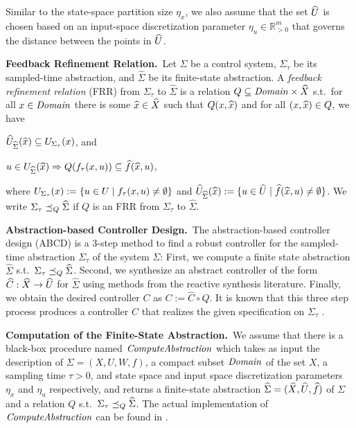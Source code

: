 Similar to the state-space partition size $\eta_x$, we also assume that the set $\widehat{U}$ is chosen based on an input-space discretization parameter $\eta_u\in \mathbb{R}^m_{>0}$ that governs the distance between the points in $\widehat{U}$.

\smallskip
\noindent\textbf{Feedback Refinement Relation.}\
Let $\Sigma$ be a control system, $\Sigma_\tau$ be its sampled-time abstraction, and $\widehat{\Sigma}$ be its finite-state abstraction.
A \emph{feedback refinement relation} (FRR) from $\Sigma_\tau$ to $\widehat{\Sigma}$ 
is a relation $Q\subseteq \mathit{Domain}\times \widehat{X}$ s.t.\ 
for all $x\in \mathit{Domain}$ there is some $\widehat{x}\in \widehat{X}$ such that $Q(x,\widehat{x})$ and
for all $(x,\widehat{x})\in Q$, we have
\begin{inparaenum}[(i)]
 \item $\widehat{U}_{\widehat{\Sigma}}(\widehat{x})\subseteq U_{\Sigma_\tau}(x)$, and 
 \item $u\in U_{\widehat{\Sigma}}(\widehat{x}) \Rightarrow Q(f_\tau(x,u))\subseteq \widehat{f}(\widehat{x},u)$,
\end{inparaenum}
where $U_{\Sigma_\tau}(x):=\{ u\in U \mid f_\tau(x,u)\neq \emptyset \}$ and $\widehat{U}_{\widehat{\Sigma}}(\widehat{x}):=\{ u\in \widehat{U} \mid \widehat{f}(\widehat{x},u)\neq \emptyset \}$.
We write $\Sigma_\tau \preceq_{Q} \widehat{\Sigma}$ if $Q$ is an FRR from $\Sigma_\tau$ to $\widehat{\Sigma}$.

\smallskip
\noindent\textbf{Abstraction-based Controller Design.}\
The abstraction-based controller design (ABCD) \cite{reissig2016feedback} is a $3$-step method to find a robust controller for the sampled-time abstraction $\Sigma_\tau$ of the system $\Sigma$:
First, we compute a finite state abstraction $\widehat{\Sigma}$ s.t.\ $\Sigma_\tau \preceq_{Q} \widehat{\Sigma}$.
Second, we synthesize an abstract controller of the form $\widehat{C}:\widehat{X}\rightarrow \widehat{U}$ for $\widehat{\Sigma}$ using methods from the reactive synthesis literature.
Finally, we obtain the desired controller $C$ as $C:=\widehat{C}\circ Q$.
It is known that this three step process produces a controller $C$ that realizes the given specification on $\Sigma_\tau$ \cite{reissig2016feedback}.

\smallskip
\noindent\textbf{Computation of the Finite-State Abstraction.}\
We assume that there is a black-box procedure named $\mathit{ComputeAbstraction}$ which takes as input the description of $\Sigma = (X,U,W,f)$, a compact subset $\mathit{Domain}$ of the set $X$, a sampling time $\tau>0$, and state space and input space discretization parameters $\eta_x$ and $\eta_u$ respectively, and returns a finite-state abstraction $\widehat{\Sigma} = (\widehat{X},\widehat{U},\widehat{f})$ of $\Sigma$ and a relation $Q$ s.t.\ $\Sigma_\tau \preceq_{Q} \widehat{\Sigma}$.
The actual implementation of $\mathit{ComputeAbstraction}$ can be found in \cite{reissig2016feedback}.

